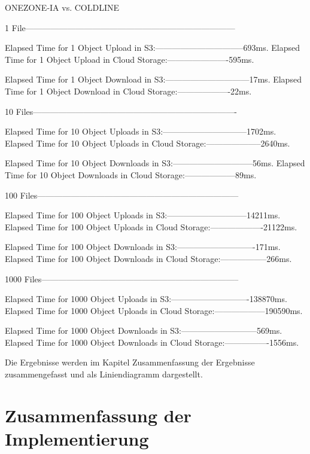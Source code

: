 \begin{code}
ONEZONE-IA vs. COLDLINE

1 File---------------------------------------------------------------------------

Elapsed Time for 1  Object Upload in S3:--------------------------------693ms.
Elapsed Time for 1 Object Upload in Cloud Storage:----------------------595ms.

Elapsed Time for 1 Object Download in S3:------------------------------17ms.
Elapsed Time for 1 Object Download in Cloud Storage:-------------------22ms.

10 Files-------------------------------------------------------------------------

Elapsed Time for 10  Object Uploads in S3:------------------------------1702ms.
Elapsed Time for 10 Object Uploads in Cloud Storage:--------------------2640ms.

Elapsed Time for 10 Object Downloads in S3:-----------------------------56ms.
Elapsed Time for 10 Object Downloads in Cloud Storage:------------------89ms.

100 Files------------------------------------------------------------------------

Elapsed Time for 100  Object Uploads in S3:-----------------------------14211ms.
Elapsed Time for 100 Object Uploads in Cloud Storage:-------------------21122ms.

Elapsed Time for 100 Object Downloads in S3:----------------------------171ms.
Elapsed Time for 100 Object Downloads in Cloud Storage:-----------------266ms.

1000 Files-----------------------------------------------------------------------

Elapsed Time for 1000  Object Uploads in S3:----------------------------138870ms.
Elapsed Time for 1000 Object Uploads in Cloud Storage:------------------190590ms.

Elapsed Time for 1000 Object Downloads in S3:---------------------------569ms.
Elapsed Time for 1000 Object Downloads in Cloud Storage:----------------1556ms.
\end{code}


Die Ergebnisse werden im Kapitel Zusammenfassung der Ergebnisse zusammengefasst und als Liniendiagramm dargestellt.

\newpage

\section{Zusammenfassung der Implementierung}

